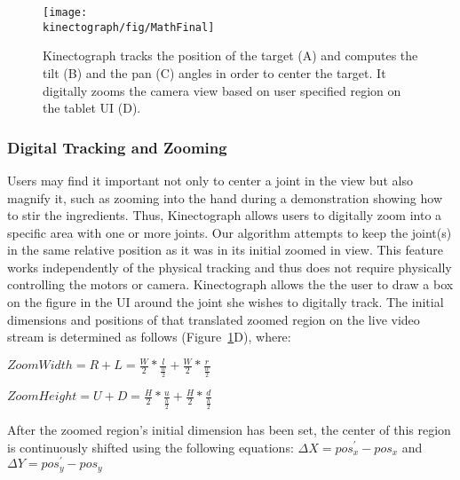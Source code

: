 
\begin{figure}[t]
\centering
\texttt{[image: \\kinectograph/fig/MathFinal]}
\caption{Kinectograph tracks the position of the target (A) and computes the tilt (B) and the pan (C) angles in order to center the target. It digitally zooms the camera view based on user specified region on the tablet UI (D).}
\label{fig:math}
\end{figure}

\subsubsection{Digital Tracking and Zooming}

Users may find it important not only to center a joint in the view but also magnify it, such as zooming into the hand during a demonstration showing how to stir the ingredients.
%
Thus, Kinectograph allows users to digitally zoom into a specific area with one or more joints. Our algorithm attempts to keep the joint(s) in the same relative position as it was in its initial zoomed in view. This feature works independently of the physical tracking and thus does not require physically controlling the motors or camera.
%
Kinectograph allows the the user to draw a box on the figure in the UI around the joint she wishes to digitally track. The initial dimensions and positions of that translated zoomed region on the live video stream is determined as follows (Figure~\ref{fig:math}D), where:

\vspace{12pt}
$ZoomWidth= R + L = \frac{W}{2}*\frac{l}{\frac{w}{2}} + \frac{W}{2}*\frac{r}{\frac{w}{2}}$

\vspace{12pt}
$ZoomHeight= U + D = \frac{H}{2}*\frac{u}{\frac{h}{2}}+ \frac{H}{2}*\frac{d}{\frac{h}{2}}$
\vspace{12pt}

After the zoomed region's initial dimension has been set, the center of this region is continuously shifted using the following equations: $\Delta X = pos_{x}^{'}-pos_{x}$ and $\Delta Y = pos_{y}^{'}-pos_{y}$

